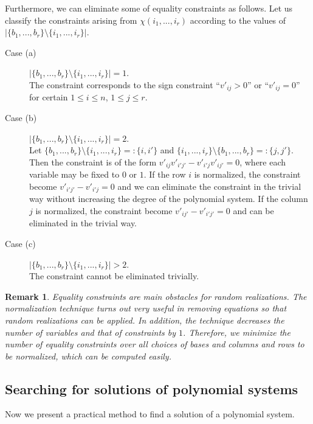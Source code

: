 \documentclass{article}
\newtheorem{remark}[thm]{\bfseries Remark}    %
\begin{document}
Furthermore, we can eliminate some of equality constraints as follows.
Let us classify the constraints arising from $\chi (i_1,...,i_r)$ according to the values of $|\{ b_1,...,b_r \} \setminus \{ i_1,...,i_r \} |$.
\begin{description}
\item[Case (a)] $|\{ b_1,...,b_r \} \setminus \{ i_1,...,i_r \} | = 1$. \\
The constraint corresponds to the sign constraint ``$v'_{ij} > 0$'' or ``$v'_{ij} = 0$'' for certain $1 \leq i \leq n$, $1 \leq j \leq r$.
\item[Case (b)] $|\{ b_1,...,b_r \} \setminus \{ i_1,...,i_r \} | = 2$. \\
Let $\{ b_1,...,b_r \} \setminus \{ i_1,...,i_r \} =: \{ i,i'\}$ and $\{ i_1,...,i_r \}  \setminus \{ b_1,...,b_r \} =: \{ j,j'\}$.
Then the constraint is of the form $v'_{ij}v'_{i'j'}-v'_{i'j}v'_{ij'}=0$, where each variable may be fixed to $0$ or $1$.
If the row $i$ is normalized, the constraint become $v'_{i'j'}-v'_{i'j}=0$ and we can eliminate the constraint in the trivial way
without increasing the degree of the polynomial system.
If the column $j$ is normalized, the constraint become $v'_{ij'}-v'_{i'j'}=0$ and can be eliminated in the trivial way.
\item[Case (c)] $|\{ b_1,...,b_r \} \setminus \{ i_1,...,i_r \} | > 2$.\\
The constraint cannot be eliminated trivially. 
\end{description}

\begin{remark}
Equality constraints are main obstacles for random realizations.
The normalization technique turns out very useful in
removing equations so that random realizations can be
applied.
In addition, the technique decreases the number of variables and that of constraints by $1$.
Therefore, we minimize the number of equality constraints over all choices of bases and columns and rows to be normalized,
which can be computed easily.
\end{remark}


\subsection{Searching for solutions of polynomial systems} \label{SSPS}
Now we present a practical method to find a solution of a polynomial system.
\end{document}
